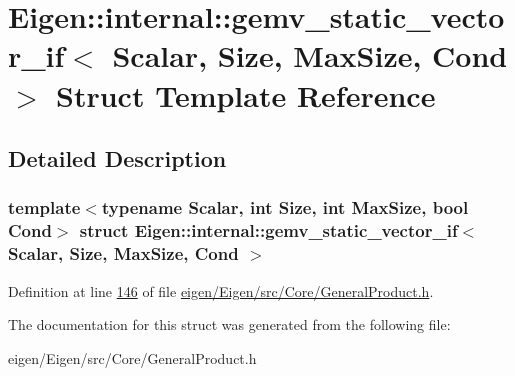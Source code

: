 \hypertarget{struct_eigen_1_1internal_1_1gemv__static__vector__if}{}\section{Eigen\+:\+:internal\+:\+:gemv\+\_\+static\+\_\+vector\+\_\+if$<$ Scalar, Size, Max\+Size, Cond $>$ Struct Template Reference}
\label{struct_eigen_1_1internal_1_1gemv__static__vector__if}


\subsection{Detailed Description}
\subsubsection*{template$<$typename Scalar, int Size, int Max\+Size, bool Cond$>$\newline
struct Eigen\+::internal\+::gemv\+\_\+static\+\_\+vector\+\_\+if$<$ Scalar, Size, Max\+Size, Cond $>$}



Definition at line \hyperlink{eigen_2_eigen_2src_2_core_2_general_product_8h_source_l00146}{146} of file \hyperlink{eigen_2_eigen_2src_2_core_2_general_product_8h_source}{eigen/\+Eigen/src/\+Core/\+General\+Product.\+h}.



The documentation for this struct was generated from the following file\+:\begin{DoxyCompactItemize}
\item 
eigen/\+Eigen/src/\+Core/\+General\+Product.\+h\end{DoxyCompactItemize}
